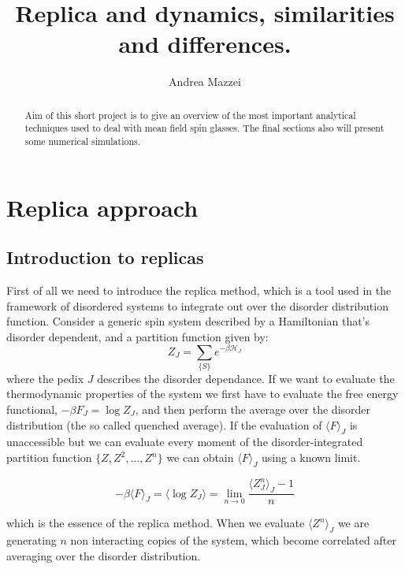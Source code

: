 \documentclass{article}
\begin{document}
\title{Replica and dynamics, similarities and differences.}
\author{Andrea Mazzei
}
\maketitle

\begin{abstract}
Aim of this short project is to give an overview of the most important analytical techniques used to deal with mean field spin glasses. The final sections also will present some numerical simulations.
\end{abstract}

\section{Replica approach}\label{prelim}

\subsection{Introduction to replicas}

First of all we need to introduce the replica method, which is a tool used in
the framework of disordered systems to integrate out over the disorder
distribution function. Consider a generic spin system described by a
Hamiltonian that's disorder dependent, and a partition function given by:
\begin{equation}
  Z_J = \sum_{\{S\}} e^{- \beta \mathcal{H}_J}
\end{equation}
where the pedix $J$ describes the disorder dependance. If we want to evaluate
the thermodynamic properties of the system we first have to evaluate the free
energy functional, $- \beta F_J = \log Z_J$, and then perform the average over
the disorder distribution (the so called quenched average). If the evaluation
of $\langle F \rangle_J$ is unaccessible but we can evaluate every moment of
the disorder-integrated partition function $\{Z, Z^2, \ldots, Z^n \}$ we can
obtain $\langle F \rangle_J$ using a known limit.

\begin{equation}
  - \beta \langle F \rangle_J = \langle \log Z_J \rangle = \lim_{n \rightarrow
  0}  \frac{\langle Z_J^n \rangle_J - 1}{n}
\end{equation}

which is the essence of the replica method. When we evaluate $\langle Z^n
\rangle_J$ we are generating $n$ non interacting copies of the system, which
become correlated after averaging over the disorder distribution.
\end{document}
